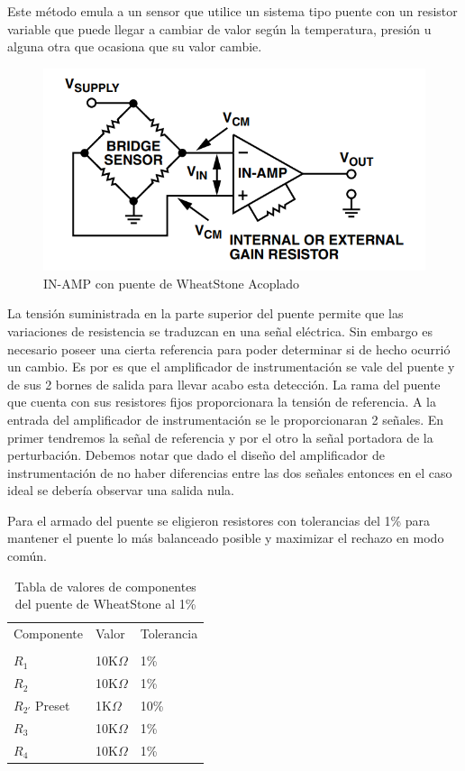 Este método emula a un sensor que utilice un sistema tipo puente con un resistor variable que puede llegar a cambiar de valor según la temperatura, presión u alguna otra que ocasiona que su valor cambie.

\begin{figure}[H]
	\centering
	\includegraphics[height=0.3\textheight]{./ImagenesVarias/wheatstoneInAmp.png}
	\caption{IN-AMP con puente de WheatStone Acoplado}
\end{figure}

La tensión suministrada en la parte superior del puente permite que las variaciones de resistencia se traduzcan en una señal eléctrica.
Sin embargo es necesario poseer una cierta referencia para poder determinar si de hecho ocurrió un cambio. Es por es que el amplificador de instrumentación se vale del puente y de sus 2 bornes de salida para llevar acabo esta detección. La rama del puente que cuenta con sus resistores fijos proporcionara la tensión de referencia.
A la entrada del amplificador de instrumentación se le proporcionaran 2 señales. En primer tendremos la señal de referencia y por el otro la señal portadora de la perturbación.
Debemos notar que dado el diseño del amplificador de instrumentación de no haber diferencias entre las dos señales entonces en el caso ideal se debería observar una salida nula. 

Para el armado del puente se eligieron resistores con tolerancias del 1\% para mantener el puente lo más balanceado posible y maximizar el rechazo en modo común.
\begin{table}[H]
	\centering
	\begin{tabular}{lll}
		Componente  		& Valor        	& Tolerancia \\
		\\
		$R_1$       		& 10K$\Omega$   & 1\%        \\
		$R_2$       		& 10K$\Omega$ 	& 1\%        \\
		$R_{2'}$ Preset      & 1K$\Omega$ 	& 10\%        \\
		$R_3$  				& 10K$\Omega$   & 1\%        \\
		$R_4$ 				& 10K$\Omega$   & 1\%		\\
	\end{tabular}
	\caption{Tabla de valores de componentes del puente de WheatStone al 1\%}
\end{table}


